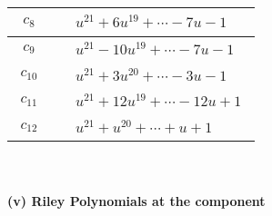 \documentclass[1p]{elsarticle_modified}
\theoremstyle{definition}
\begin{document}
\begin{tabular}{m{50pt}|m{274pt}}
\hline $$\begin{aligned}c_{8}\end{aligned}$$&$\begin{aligned}
&u^{21}+6 u^{19}+\cdots-7 u-1
\end{aligned}$\\
\hline $$\begin{aligned}c_{9}\end{aligned}$$&$\begin{aligned}
&u^{21}-10 u^{19}+\cdots-7 u-1
\end{aligned}$\\
\hline $$\begin{aligned}c_{10}\end{aligned}$$&$\begin{aligned}
&u^{21}+3 u^{20}+\cdots-3 u-1
\end{aligned}$\\
\hline $$\begin{aligned}c_{11}\end{aligned}$$&$\begin{aligned}
&u^{21}+12 u^{19}+\cdots-12 u+1
\end{aligned}$\\
\hline $$\begin{aligned}c_{12}\end{aligned}$$&$\begin{aligned}
&u^{21}+u^{20}+\cdots+u+1
\end{aligned}$\\
\hline
\end{tabular}\\~\\
\newpage\renewcommand{\arraystretch}{1}
\flushleft \textbf{(v) Riley Polynomials at the component}\newline \\
\end{document}

